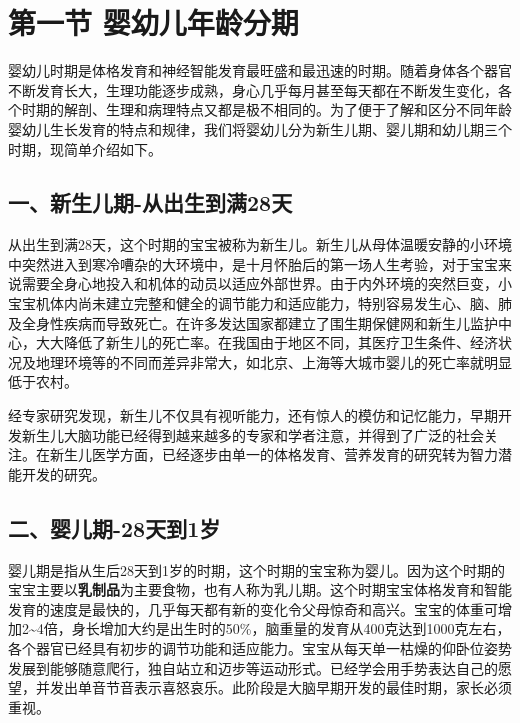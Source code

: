\documentclass[
]{article}
\author{}
\date{}
\begin{document}
\hypertarget{ux7b2cux4e00ux8282-ux5a74ux5e7cux513fux5e74ux9f84ux5206ux671f}{%
\section{第一节
婴幼儿年龄分期}\label{ux7b2cux4e00ux8282-ux5a74ux5e7cux513fux5e74ux9f84ux5206ux671f}}

婴幼儿时期是体格发育和神经智能发育最旺盛和最迅速的时期。随着身体各个器官不断发育长大，生理功能逐步成熟，身心几乎每月甚至每天都在不断发生变化，各个时期的解剖、生理和病理特点又都是极不相同的。为了便于了解和区分不同年龄婴幼儿生长发育的特点和规律，我们将婴幼儿分为新生儿期、婴儿期和幼儿期三个时期，现简单介绍如下。

\hypertarget{ux4e00ux65b0ux751fux513fux671f-ux4eceux51faux751fux5230ux6ee128ux5929}{%
\subsection{一、新生儿期-从出生到满28天}\label{ux4e00ux65b0ux751fux513fux671f-ux4eceux51faux751fux5230ux6ee128ux5929}}

从出生到满28天，这个时期的宝宝被称为新生儿。新生儿从母体温暖安静的小环境中突然进入到寒冷嘈杂的大环境中，是十月怀胎后的第一场人生考验，对于宝宝来说需要全身心地投入和机体的动员以适应外部世界。由于内外环境的突然巨变，小宝宝机体内尚未建立完整和健全的调节能力和适应能力，特别容易发生心、脑、肺及全身性疾病而导致死亡。在许多发达国家都建立了围生期保健网和新生儿监护中心，大大降低了新生儿的死亡率。在我国由于地区不同，其医疗卫生条件、经济状况及地理环境等的不同而差异非常大，如北京、上海等大城市婴儿的死亡率就明显低于农村。

经专家研究发现，新生儿不仅具有视听能力，还有惊人的模仿和记忆能力，早期开发新生儿大脑功能已经得到越来越多的专家和学者注意，并得到了广泛的社会关注。在新生儿医学方面，已经逐步由单一的体格发育、营养发育的研究转为智力潜能开发的研究。

\hypertarget{ux4e8cux5a74ux513fux671f-28ux5929ux52301ux5c81}{%
\subsection{二、婴儿期-28天到1岁}\label{ux4e8cux5a74ux513fux671f-28ux5929ux52301ux5c81}}

婴儿期是指从生后28天到1岁的时期，这个时期的宝宝称为婴儿。因为这个时期的宝宝主要以\textbf{乳制品}为主要食物，也有人称为乳儿期。这个时期宝宝体格发育和智能发育的速度是最快的，几乎每天都有新的变化令父母惊奇和高兴。宝宝的体重可增加2\textasciitilde4倍，身长增加大约是出生时的50\%，脑重量的发育从400克达到1000克左右，各个器官已经具有初步的调节功能和适应能力。宝宝从每天单一枯燥的仰卧位姿势发展到能够随意爬行，独自站立和迈步等运动形式。已经学会用手势表达自己的愿望，并发出单音节音表示喜怒哀乐。此阶段是大脑早期开发的最佳时期，家长必须重视。
\end{document}
